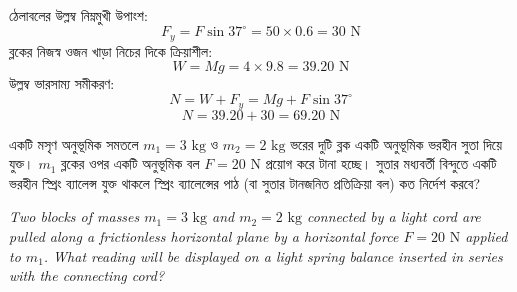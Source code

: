 \documentclass[12pt, a4paper]{article}
\begin{document}
\begin{tcolorbox}[solutionbox={সমাধান (Solution)}]
\noindent
ঠেলাবলের উল্লম্ব নিম্নমুখী উপাংশ:
\[ F_y = F \sin 37^\circ = 50 \times 0.6 = 30\text{ N} \]
ব্লকের নিজস্ব ওজন খাড়া নিচের দিকে ক্রিয়াশীল:
\[ W = M g = 4 \times 9.8 = 39.20\text{ N} \]
উল্লম্ব ভারসাম্য সমীকরণ:
\[ N = W + F_y = M g + F \sin 37^\circ \]
\[ N = 39.20 + 30 = 69.20\text{ N} \]
\end{tcolorbox}


\begin{tcolorbox}[questionbox={প্রশ্ন (Question) 14}]
\noindent
একটি মসৃণ অনুভূমিক সমতলে $m_1 = 3\text{ kg}$ ও $m_2 = 2\text{ kg}$ ভরের দুটি ব্লক একটি অনুভূমিক ভরহীন সুতা দিয়ে যুক্ত। $m_1$ ব্লকের ওপর একটি অনুভূমিক বল $F = 20\text{ N}$ প্রয়োগ করে টানা হচ্ছে। সুতার মধ্যবর্তী বিন্দুতে একটি ভরহীন স্প্রিং ব্যালেন্স যুক্ত থাকলে স্প্রিং ব্যালেন্সের পাঠ (বা সুতার টানজনিত প্রতিক্রিয়া বল) কত নির্দেশ করবে?

\vspace{0.8em}
\begin{english}
\noindent\textit{\color{darkgray}
Two blocks of masses $m_1 = 3\text{ kg}$ and $m_2 = 2\text{ kg}$ connected by a light cord are pulled along a frictionless horizontal plane by a horizontal force $F = 20\text{ N}$ applied to $m_1$. What reading will be displayed on a light spring balance inserted in series with the connecting cord?
}
\end{english}
\end{tcolorbox}
\end{document}
